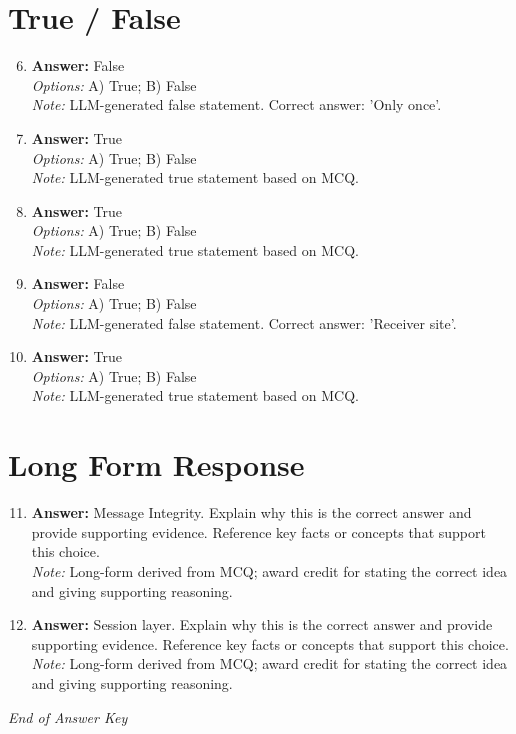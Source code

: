\documentclass[12pt]{article}
\begin{document}
\section*{True / False}
\begin{enumerate}[label=\arabic*.]
\setcounter{enumi}{5}
\item \textbf{Answer:} False
\\ \textit{Options:} A) True; B) False
\\ \textit{Note:} LLM-generated false statement. Correct answer: 'Only once'.
\item \textbf{Answer:} True
\\ \textit{Options:} A) True; B) False
\\ \textit{Note:} LLM-generated true statement based on MCQ.
\item \textbf{Answer:} True
\\ \textit{Options:} A) True; B) False
\\ \textit{Note:} LLM-generated true statement based on MCQ.
\item \textbf{Answer:} False
\\ \textit{Options:} A) True; B) False
\\ \textit{Note:} LLM-generated false statement. Correct answer: 'Receiver site'.
\item \textbf{Answer:} True
\\ \textit{Options:} A) True; B) False
\\ \textit{Note:} LLM-generated true statement based on MCQ.
\end{enumerate}

\section*{Long Form Response}
\begin{enumerate}[label=\arabic*.]
\setcounter{enumi}{10}
\item \textbf{Answer:} Message Integrity. Explain why this is the correct answer and provide supporting evidence. Reference key facts or concepts that support this choice.
\\ \textit{Note:} Long-form derived from MCQ; award credit for stating the correct idea and giving supporting reasoning.
\item \textbf{Answer:} Session layer. Explain why this is the correct answer and provide supporting evidence. Reference key facts or concepts that support this choice.
\\ \textit{Note:} Long-form derived from MCQ; award credit for stating the correct idea and giving supporting reasoning.
\end{enumerate}

\vfill
\noindent\textit{End of Answer Key}
\end{document}
